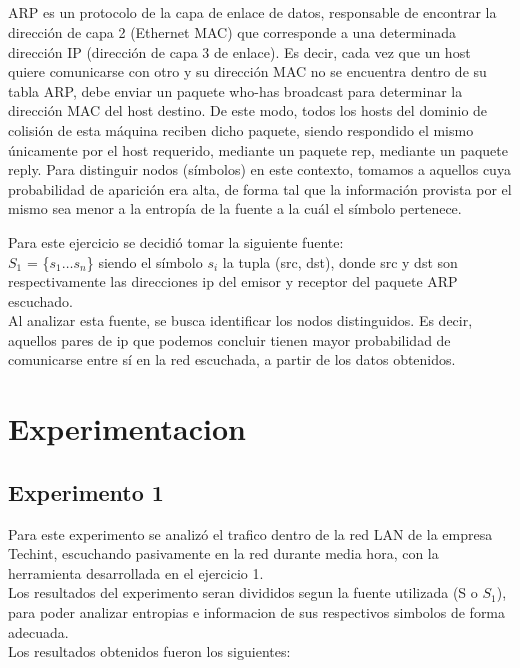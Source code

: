 \documentclass[final,narroweqnarray,inline]{ieee}
\begin{document}
\subsection{}
ARP es un protocolo de la capa de enlace de datos, responsable de encontrar
la dirección de capa 2 (Ethernet MAC) que corresponde a una determinada
dirección IP (dirección de capa 3 de enlace). Es decir, cada vez que un host
quiere comunicarse con otro y su dirección MAC no se encuentra dentro de su
tabla ARP, debe enviar un paquete who-has broadcast para determinar la dirección MAC
del host destino. De este modo, todos los hosts del dominio de colisión de
esta máquina reciben dicho paquete, siendo respondido el mismo únicamente
por el host requerido, mediante un paquete rep, mediante un paquete reply.
Para distinguir nodos (símbolos) en este contexto, tomamos a aquellos cuya
probabilidad de aparición era alta, de forma tal que la información provista
por el mismo sea menor a la entropía de la fuente a la cuál el símbolo
pertenece.

\medskip
Para este ejercicio se decidi\'o tomar la siguiente fuente: \\ 
$S_{1}$ = \{$s_{1} \dots s_{n}$\} siendo el símbolo $s_{i}$ la tupla (src, dst), donde
src y dst son respectivamente las direcciones ip del emisor y receptor del
paquete ARP escuchado.  \\
Al analizar esta fuente, se busca identificar los nodos distinguidos. Es
decir, aquellos pares de ip que podemos concluir tienen mayor probabilidad de comunicarse
entre sí en la red escuchada, a partir de los datos obtenidos. 


\section{Experimentacion}


\subsection{Experimento 1}
Para este experimento se analiz\'o el trafico dentro de la red LAN de la empresa Techint, escuchando pasivamente
en la red durante media hora, con la herramienta desarrollada en el ejercicio 1. \\
Los resultados del experimento seran divididos segun la fuente utilizada (S o $S_{1}$), para poder analizar
entropias e informacion de sus respectivos simbolos de forma adecuada. \\
Los resultados obtenidos fueron los siguientes: 
\end{document}
